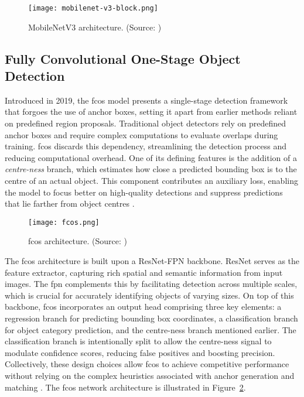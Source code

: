 \begin{figure}[!htbp]
    \centering
    \texttt{[image: mobilenet-v3-block.png]}
    \caption{MobileNetV3 architecture. (Source: \cite{mobilenetv3})}
    \label{fig:ssdlite2}
\end{figure}

\subsection{Fully Convolutional One-Stage Object Detection}
\label{subsec:4_fcos}

Introduced in 2019, the \gls{fcos} model \cite{fcos} presents a single-stage detection framework that forgoes the use of anchor boxes, setting it apart from earlier methods reliant on predefined region proposals. Traditional object detectors rely on predefined anchor boxes and require complex computations to evaluate overlaps during training. \gls{fcos} discards this dependency, streamlining the detection process and reducing computational overhead. One of its defining features is the addition of a \textit{centre-ness} branch, which estimates how close a predicted bounding box is to the centre of an actual object. This component contributes an auxiliary loss, enabling the model to focus better on high-quality detections and suppress predictions that lie farther from object centres \cite{fcos}.

\begin{figure}[!htbp]
    \centering
    \texttt{[image: fcos.png]}
    \caption{\gls{fcos} architecture. (Source: \cite{fcos})}
    \label{fig:fcos}
\end{figure}

The \gls{fcos} architecture is built upon a ResNet-FPN backbone. ResNet serves as the feature extractor, capturing rich spatial and semantic information from input images. The \gls{fpn} complements this by facilitating detection across multiple scales, which is crucial for accurately identifying objects of varying sizes. On top of this backbone, \gls{fcos} incorporates an output head comprising three key elements: a regression branch for predicting bounding box coordinates, a classification branch for object category prediction, and the centre-ness branch mentioned earlier. The classification branch is intentionally split to allow the centre-ness signal to modulate confidence scores, reducing false positives and boosting precision. Collectively, these design choices allow \gls{fcos} to achieve competitive performance without relying on the complex heuristics associated with anchor generation and matching \cite{fcos}. The \gls{fcos} network architecture is illustrated in Figure~\ref{fig:fcos}.

